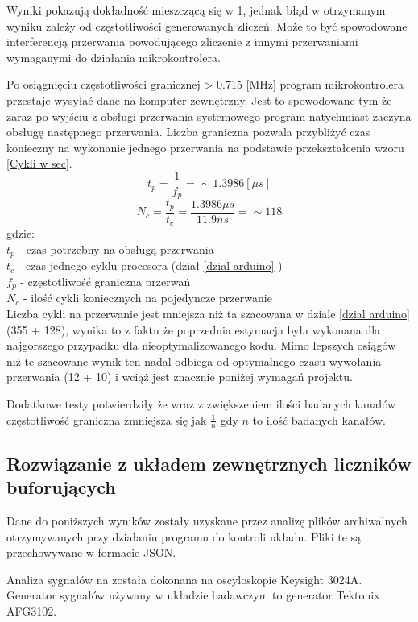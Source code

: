 Wyniki pokazują dokładność mieszczącą się w  1\textperthousand, 
jednak błąd w otrzymanym wyniku zależy od częstotliwości generowanych zliczeń.
Może to być spowodowane interferencją przerwania powodującego zliczenie z innymi przerwaniami wymaganymi do działania mikrokontrolera.

Po osiągnięciu częstotliwości granicznej > 0.715 [MHz] program mikrokontrolera przestaje wysyłać dane na komputer zewnętrzny.
Jest to spowodowane tym że zaraz po wyjściu z obsługi przerwania systemowego program natychmiast zaczyna obsługę następnego przerwania. 
Liczba graniczna pozwala przybliżyć czas konieczny na wykonanie jednego przerwania na podstawie przekształcenia wzoru \ref{Cykli w sec}. 
$$ t_p = \frac{1}{f_p} = \sim 1.3986 [\mu s] $$
$$ N_c = \frac{t_p}{t_c} =  \frac{1.3986 \mu s}{11.9 ns} =\sim 118$$
gdzie: \\
        \indent $t_p$ -  czas potrzebny na obsługą przerwania\\
        \indent $t_c$ -  czas jednego cyklu procesora (dział \ref{dzial arduino} ) \\
        \indent $f_p$ -  częstotliwość graniczna przerwań \\
        \indent $N_c$ -  ilość cykli koniecznych na pojedyncze przerwanie \\

Liczba cykli na przerwanie jest mniejsza niż ta szacowana w dziale \ref{dzial arduino} (355 + 128)\cite{ard_opt_git}, wynika to z faktu że poprzednia estymacja była wykonana dla najgorszego przypadku dla nieoptymalizowanego kodu.
Mimo lepszych osiągów niż te szacowane wynik ten nadal odbiega od optymalnego czasu wywołania przerwania (12 + 10) \cite{interupt latency} i wciąż jest znacznie poniżej wymagań projektu. 

Dodatkowe testy potwierdziły że wraz z zwiększeniem ilości badanych kanałów częstotliwość graniczna zmniejsza się jak $\frac{1}{n}$ gdy $n$ to ilość badanych kanałów. 

\subsection{Rozwiązanie z układem zewnętrznych liczników buforujących}

Dane do poniższych wyników zostały uzyskane przez analizę plików archiwalnych otrzymywanych przy działaniu programu do kontroli układu.
Pliki te są przechowywane w formacie JSON.

Analiza sygnałów na została dokonana na oscyloskopie Keysight 3024A. Generator sygnałów używany w układzie badawczym to generator Tektonix AFG3102.

